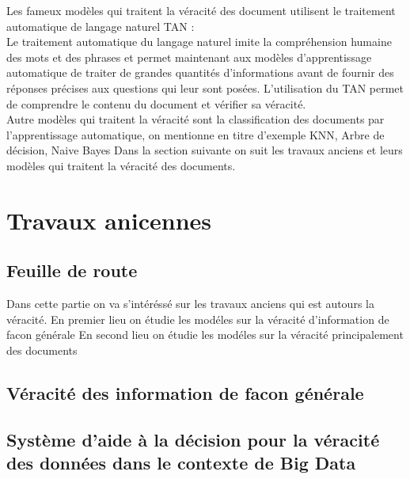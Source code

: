 \documentclass[12pt]{report}
\begin{document}
Les fameux modèles qui traitent la véracité des document utilisent le traitement automatique de langage naturel TAN :\\ Le traitement automatique du langage naturel imite la compréhension
humaine des mots et des phrases et permet maintenant aux modèles
d'apprentissage automatique de traiter de grandes quantités d'informations
avant de fournir des réponses précises aux questions qui leur sont posées.
L'utilisation du TAN permet de comprendre le contenu du document et vérifier sa véracité.
\\Autre modèles qui traitent la véracité sont la classification des documents par l'apprentissage automatique, on mentionne en titre d'exemple KNN, Arbre de décision, Naive Bayes
Dans la section suivante on suit les travaux anciens et leurs modèles qui traitent la véracité des documents.

\section{Travaux anicennes}

\subsection{Feuille de route}

Dans cette partie on va s’intéréssé sur les travaux anciens qui est autours la véracité. 
En premier lieu on étudie les modéles sur la véracité d’information de facon générale
En second lieu on étudie les modéles sur la véracité principalement des documents

\subsection*{Véracité des information de facon générale}

\subsection{Système d’aide à la décision pour la véracité des données dans le contexte de Big Data}
\end{document}
